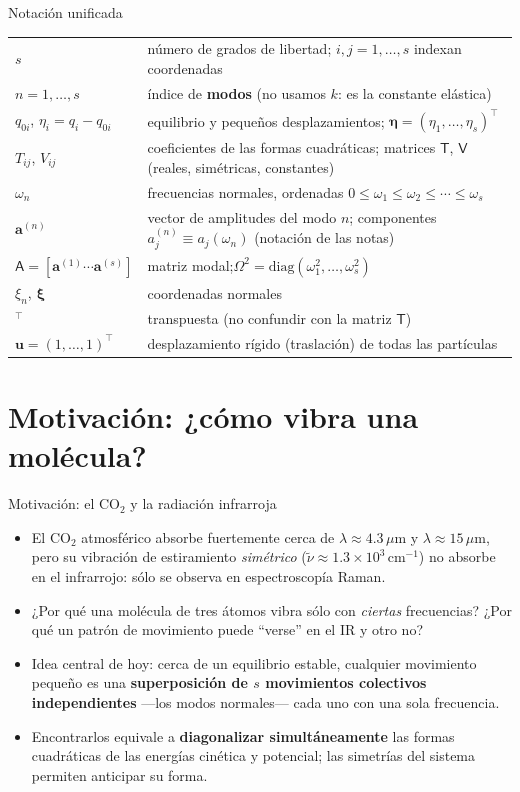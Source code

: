 \documentclass[spanish,10pt]{beamer}
\newcommand{\Tm}{\mathsf{T}}                 %
\newcommand{\Vm}{\mathsf{V}}                 %
\newcommand{\Am}{\mathsf{A}}                 %
\newcommand{\Om}{\Omega}                   %
\newcommand{\ev}{\bm{\eta}}                  %
\newcommand{\xiv}{\bm{\xi}}                  %
\newcommand{\av}[1]{\mathbf{a}^{(#1)}}       %
\newcommand{\uv}{\mathbf{u}}                 %
\newcommand{\tr}{^{\top}}                    %
\begin{document}
\begin{frame}{Notación unificada}
\small
\begin{tabularx}{\textwidth}{@{}l X@{}}
\toprule
$s$ & número de grados de libertad; $i,j=1,\dots,s$ indexan coordenadas \\
$n=1,\dots,s$ & índice de \textbf{modos} (no usamos $k$: es la constante elástica) \\
$q_{0i}$,\; $\eta_i=q_i-q_{0i}$ & equilibrio y pequeños desplazamientos; $\ev=(\eta_1,\dots,\eta_s)\tr$ \\
$T_{ij}$, $V_{ij}$ & coeficientes de las formas cuadráticas; matrices $\Tm$, $\Vm$ (reales, simétricas, constantes) \\
$\omega_n$ & frecuencias normales, ordenadas $0\le\omega_1\le\omega_2\le\cdots\le\omega_s$ \\
$\av{n}$ & vector de amplitudes del modo $n$; componentes $a_j^{(n)}\equiv a_j(\omega_n)$ (notación de las notas) \\
$\Am=[\av1\cdots\av s]$ & matriz modal;\quad $\Om^2=\mathrm{diag}(\omega_1^2,\dots,\omega_s^2)$ \\
$\xi_n$,\; $\xiv$ & coordenadas normales \\
$^{\top}$ & transpuesta (no confundir con la matriz $\Tm$) \\
$\uv=(1,\dots,1)\tr$ & desplazamiento rígido (traslación) de todas las partículas \\
\bottomrule
\end{tabularx}
\end{frame}

\section{Motivación: ¿cómo vibra una molécula?}
\begin{frame}{Motivación: el CO$_2$ y la radiación infrarroja}
\begin{itemize}[<+->]
  \item El CO$_2$ atmosférico absorbe fuertemente cerca de $\lambda\approx 4.3\,\mu$m y $\lambda\approx 15\,\mu$m, pero su vibración de estiramiento \emph{simétrico} ($\tilde\nu\approx 1.3\times10^{3}\,\mathrm{cm}^{-1}$) no absorbe en el infrarrojo: sólo se observa en espectroscopía Raman.
  \item ¿Por qué una molécula de tres átomos vibra sólo con \emph{ciertas} frecuencias? ¿Por qué un patrón de movimiento puede ``verse'' en el IR y otro no?
  \item Idea central de hoy: cerca de un equilibrio estable, cualquier movimiento pequeño es una \textbf{superposición de $s$ movimientos colectivos independientes} —los modos normales— cada uno con una sola frecuencia.
  \item Encontrarlos equivale a \textbf{diagonalizar simultáneamente} las formas cuadráticas de las energías cinética y potencial; las simetrías del sistema permiten anticipar su forma.
\end{itemize}
\end{frame}
\end{document}

